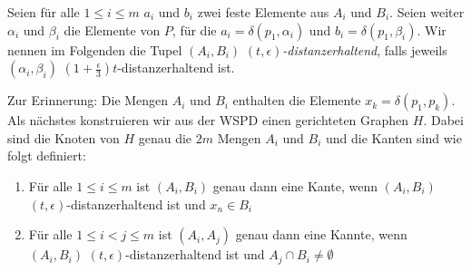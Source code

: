 \documentclass[11pt]{article}
\begin{document}
    Seien für alle $1 \leq i \leq m$ $a_i$ und $b_i$ zwei feste Elemente aus $A_i$ und $B_i$. Seien weiter $\alpha_i$ und $\beta_i$ die Elemente von $P$, für die $a_i = \delta(p_1, \alpha_i)$ und $b_i = \delta(p_1, \beta_i)$. Wir nennen im Folgenden die Tupel $(A_i, B_i)$ \emph{$(t, \epsilon)$-distanzerhaltend}, falls jeweils $(\alpha_i, \beta_i)$ $(1 + \frac{\epsilon }{3})t$-distanzerhaltend ist.
    
    Zur Erinnerung: Die Mengen $A_i$ und $B_i$ enthalten die Elemente $x_k = \delta(p_1, p_k)$.
    Als nächstes konstruieren wir aus der WSPD einen gerichteten Graphen $H$. Dabei sind die Knoten von $H$ genau die $2m$ Mengen $A_i$ und $B_i$ und die Kanten sind wie folgt definiert:
    \begin{enumerate}
    	\item Für alle $1 \leq i \leq m$ ist $(A_i, B_i)$ genau dann eine Kante, wenn $(A_i, B_i)$ $(t, \epsilon)$-distanzerhaltend ist und $x_n \in B_i$
    	\item Für alle $1\leq i < j \leq m$ ist $(A_i, A_j)$ genau dann eine Kannte, wenn $(A_i, B_i)$ $(t, \epsilon)$-distanzerhaltend ist und $A_j \cap B_i \neq \emptyset$
    \end{enumerate}
\end{document}
